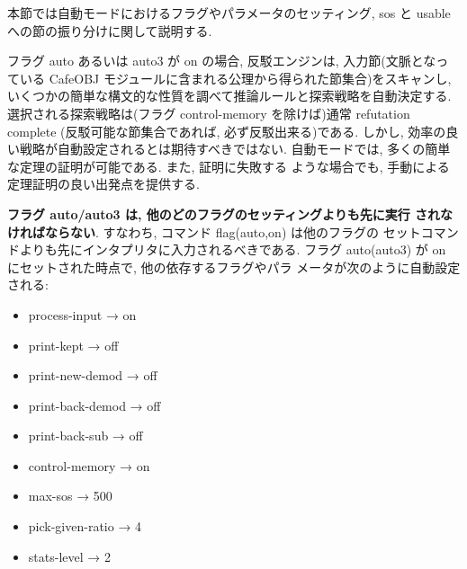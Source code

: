 本節では自動モードにおけるフラグやパラメータのセッティング, 
sos と usable への節の振り分けに関して説明する.

フラグ auto あるいは auto3 が on の場合, 反駁エンジンは, 入力節(文脈となっ
ている CafeOBJ モジュールに含まれる公理から得られた節集合)をスキャンし,
いくつかの簡単な構文的な性質を調べて推論ルールと探索戦略を自動決定する. 
選択される探索戦略は(フラグ control-memory を除けば)通常 refutation
complete (反駁可能な節集合であれば, 必ず反駁出来る)である. 
しかし, 効率の良い戦略が自動設定されるとは期待すべきではない.
自動モードでは, 多くの簡単な定理の証明が可能である. また, 証明に失敗する
ような場合でも, 手動による定理証明の良い出発点を提供する. 

\textbf{フラグ auto/auto3 は, 他のどのフラグのセッティングよりも先に実行
  されなければならない}. すなわち, コマンド flag(auto,on) は他のフラグの
セットコマンドよりも先にインタプリタに入力されるべきである.
フラグ auto(auto3) が on にセットされた時点で, 他の依存するフラグやパラ
メータが次のように自動設定される: 
\begin{itemize}
  \item process-input → on
  \item print-kept → off
  \item print-new-demod → off
  \item print-back-demod → off
  \item print-back-sub → off
  \item control-memory → on
  \item max-sos → 500
  \item pick-given-ratio → 4
  \item stats-level → 2
\end{itemize}

